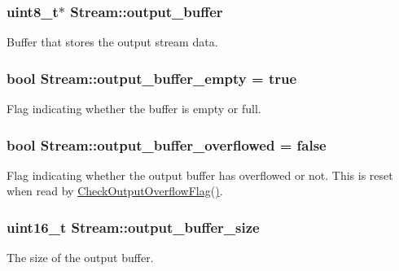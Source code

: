 \subsubsection[{\texorpdfstring{output\+\_\+buffer}{output_buffer}}]{\setlength{\rightskip}{0pt plus 5cm}uint8\+\_\+t$\ast$ Stream\+::output\+\_\+buffer\hspace{0.3cm}{\ttfamily [protected]}}\hypertarget{class_stream_a3cd072a10ad5c1b6308dd2da2cdbec71}{}\label{class_stream_a3cd072a10ad5c1b6308dd2da2cdbec71}
Buffer that stores the output stream data. 
\subsubsection[{\texorpdfstring{output\+\_\+buffer\+\_\+empty}{output_buffer_empty}}]{\setlength{\rightskip}{0pt plus 5cm}bool Stream\+::output\+\_\+buffer\+\_\+empty = true\hspace{0.3cm}{\ttfamily [protected]}}\hypertarget{class_stream_a54b21caaee0001e44968fb70d0a591f5}{}\label{class_stream_a54b21caaee0001e44968fb70d0a591f5}
Flag indicating whether the buffer is empty or full. 
\subsubsection[{\texorpdfstring{output\+\_\+buffer\+\_\+overflowed}{output_buffer_overflowed}}]{\setlength{\rightskip}{0pt plus 5cm}bool Stream\+::output\+\_\+buffer\+\_\+overflowed = false\hspace{0.3cm}{\ttfamily [protected]}}\hypertarget{class_stream_a149776fead5c56894699da5bfe489b65}{}\label{class_stream_a149776fead5c56894699da5bfe489b65}
Flag indicating whether the output buffer has overflowed or not. This is reset when read by \hyperlink{class_stream_aee6c201819b874c5934a270592d9d311}{Check\+Output\+Overflow\+Flag()}. 
\subsubsection[{\texorpdfstring{output\+\_\+buffer\+\_\+size}{output_buffer_size}}]{\setlength{\rightskip}{0pt plus 5cm}uint16\+\_\+t Stream\+::output\+\_\+buffer\+\_\+size\hspace{0.3cm}{\ttfamily [protected]}}\hypertarget{class_stream_a0e9fd6570bafb97ab76ebd37158e78ff}{}\label{class_stream_a0e9fd6570bafb97ab76ebd37158e78ff}
The size of the output buffer. 
